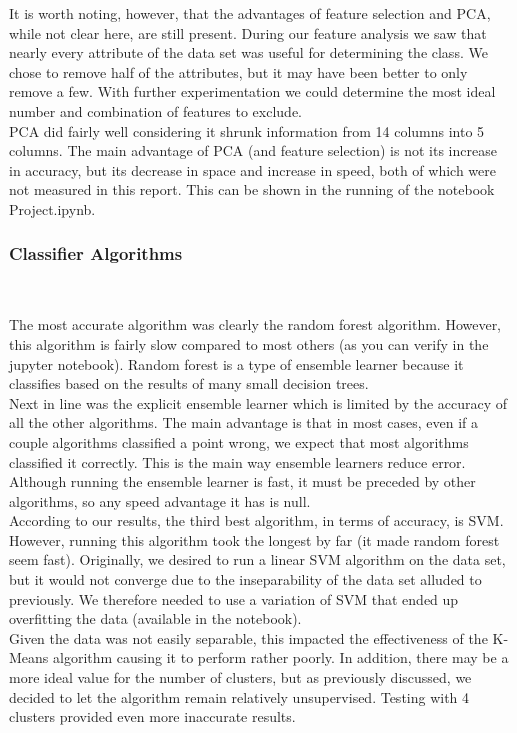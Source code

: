 \documentclass{article}
\begin{document}
	It is worth noting, however, that the advantages of feature selection and PCA, while not clear here, are still present. During our feature analysis we saw that nearly every attribute of the data set was useful for determining the class. We chose to remove half of the attributes, but it may have been better to only remove a few. With further experimentation we could determine the most ideal number and combination of features to exclude.\\
	
	PCA did fairly well considering it shrunk information from 14 columns into 5 columns. The main advantage of PCA (and feature selection) is not its increase in accuracy, but its decrease in space and increase in speed, both of which were not measured in this report.	This can be shown in the running of the notebook Project.ipynb.
	
	\subsubsection{Classifier Algorithms}~
	
	The most accurate algorithm was clearly the random forest algorithm. However, this algorithm is fairly slow compared to most others (as you can verify in the jupyter notebook). Random forest is a type of ensemble learner because it classifies based on the results of many small decision trees.\\
	Next in line was the explicit ensemble learner which is limited by the accuracy of all the other algorithms. The main advantage is that in most cases, even if a couple algorithms classified a point wrong, we expect that most algorithms classified it correctly. This is the main way ensemble learners reduce error. Although running the ensemble learner is fast, it must be preceded by other algorithms, so any speed advantage it has is null.\\
	
	According to our results, the third best algorithm, in terms of accuracy, is SVM. However, running this algorithm took the longest by far (it made random forest seem fast). Originally, we desired to run a linear SVM algorithm on the data set, but it would not converge due to the inseparability of the data set alluded to previously. We therefore needed to use a variation of SVM that ended up overfitting the data (available in the notebook).\\
	
	Given the data was not easily separable, this impacted the effectiveness of the K-Means algorithm causing it to perform rather poorly. In addition, there may be a more ideal value for the number of clusters, but as previously discussed, we decided to let the algorithm remain relatively unsupervised. Testing with 4 clusters provided even more inaccurate results.
	
\end{document}

